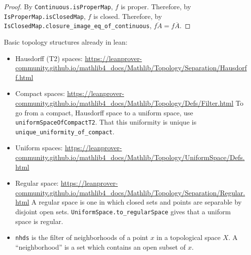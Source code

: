 \begin{proof}
\leanok{}
    By \verb|Continuous.isProperMap|, $f$ is proper. Therefore, by \verb|IsProperMap.isClosedMap|, $f$ is closed. Therefore, by \verb|IsClosedMap.closure_image_eq_of_continuous|, $\overline{fA} = f \overline{A}$.
\end{proof}

\begin{leanrmk}
    Basic topology structures already in lean:
    \begin{itemize}
        \item Hausdorff (T2) spaces: \url{https://leanprover-community.github.io/mathlib4_docs/Mathlib/Topology/Separation/Hausdorff.html}

        \item Compact spaces: \url{https://leanprover-community.github.io/mathlib4_docs/Mathlib/Topology/Defs/Filter.html} To go from a compact, Hausdorff space to a uniform space, use \verb|uniformSpaceOfCompactT2|. That this uniformity is unique is \verb|unique_uniformity_of_compact|.

        \item Uniform spaces: \url{https://leanprover-community.github.io/mathlib4_docs/Mathlib/Topology/UniformSpace/Defs.html}

        \item Regular space:  \url{https://leanprover-community.github.io/mathlib4_docs/Mathlib/Topology/Separation/Regular.html} A regular space is one in which closed sets and points are separable by disjoint open sets. \verb|UniformSpace.to_regularSpace| gives that a uniform space is regular.

        \item \verb|nhds| is the filter of neighborhoods of a point $x$ in a topological space $X$.  A ``neighborhood'' is a set which contains an open subset of $x$.
    \end{itemize}
\end{leanrmk}

